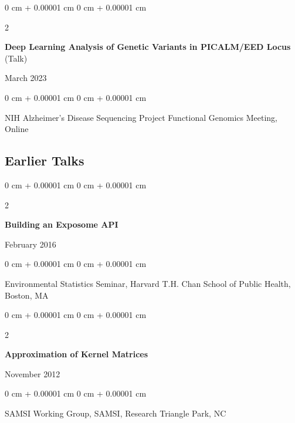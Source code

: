 \documentclass[10pt, letterpaper]{article}
\newenvironment{onecolentry}{
    \begin{adjustwidth}{
        0 cm + 0.00001 cm
    }{
        0 cm + 0.00001 cm
    }
}{
    \end{adjustwidth}
} %
\newenvironment{twocolentry}[2][]{
    \onecolentry
    \def\secondColumn{#2}
    \setcolumnwidth{\fill, 4.5 cm}
    \begin{paracol}{2}
}{
    \switchcolumn \raggedleft \secondColumn
    \end{paracol}
    \endonecolentry
} %
\begin{document}
    \vspace{0.20 cm}

    \begin{samepage}
        \begin{twocolentry}{
            March 2023
        }
            \textbf{Deep Learning Analysis of Genetic Variants in PICALM/EED Locus} (Talk)
        \end{twocolentry}

        \vspace{0.10 cm}

        \begin{onecolentry}
            NIH Alzheimer's Disease Sequencing Project Functional Genomics Meeting, Online
        \end{onecolentry}
    \end{samepage}

    \vspace{0.20 cm}

\subsection{Earlier Talks}

    \begin{samepage}
        \begin{twocolentry}{
            February 2016
        }
            \textbf{Building an Exposome API}
        \end{twocolentry}

        \vspace{0.10 cm}

        \begin{onecolentry}
            Environmental Statistics Seminar, Harvard T.H. Chan School of Public Health, Boston, MA
        \end{onecolentry}
    \end{samepage}

    \vspace{0.20 cm}

    \begin{samepage}
        \begin{twocolentry}{
            November 2012
        }
            \textbf{Approximation of Kernel Matrices}
        \end{twocolentry}

        \vspace{0.10 cm}

        \begin{onecolentry}
            SAMSI Working Group, SAMSI, Research Triangle Park, NC
        \end{onecolentry}
    \end{samepage}
\end{document}
